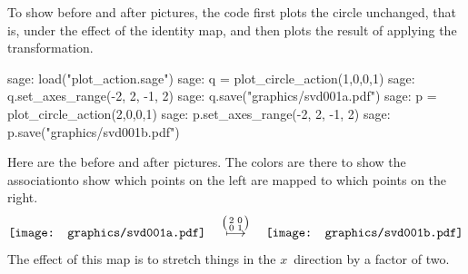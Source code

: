 To show before and after pictures, the code first plots the circle unchanged, that is,
under the effect of the identity map, and then plots the result of applying
the transformation.
\begin{sagecommandline}
sage: load("plot_action.sage")
sage: q = plot_circle_action(1,0,0,1) 
sage: q.set_axes_range(-2, 2, -1, 2) 
sage: q.save("graphics/svd001a.pdf")
sage: p = plot_circle_action(2,0,0,1) 
sage: p.set_axes_range(-2, 2, -1, 2) 
sage: p.save("graphics/svd001b.pdf")
\end{sagecommandline}
Here are the before and after pictures.
The colors are there to show the association\Dash to show which 
points on the left are mapped to which points 
on the right.
\begin{equation*}
  \vcenteredhbox{\texttt{[image: graphics/svd001a.pdf]}}
  \quad\mapsunder{\big (\begin{smallmatrix} 2 &0 \\ 0 &1 \end{smallmatrix}\big )}\quad
  \vcenteredhbox{\texttt{[image: graphics/svd001b.pdf]}}
\end{equation*}
The effect of this map is to stretch things in the $x$~direction by a factor of two.

